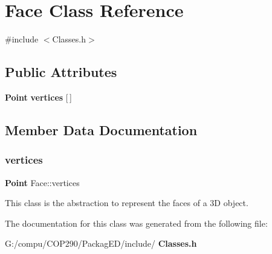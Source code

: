 \section{Face Class Reference}
\label{class_face}


{\ttfamily \#include $<$Classes.\+h$>$}

\subsection*{Public Attributes}
\begin{DoxyCompactItemize}
\item 
\textbf{ Point} \textbf{ vertices} [$\,$]
\end{DoxyCompactItemize}


\subsection{Member Data Documentation}
\mbox{\label{class_face_a9aaee89c26799e73f6bc988c54e675f9}} 
\subsubsection{vertices}
{\footnotesize\ttfamily \textbf{ Point} Face\+::vertices}

This class is the abstraction to represent the faces of a 3D object. 

The documentation for this class was generated from the following file\+:\begin{DoxyCompactItemize}
\item 
G\+:/compu/\+C\+O\+P290/\+Packag\+E\+D/include/\textbf{ Classes.\+h}\end{DoxyCompactItemize}
